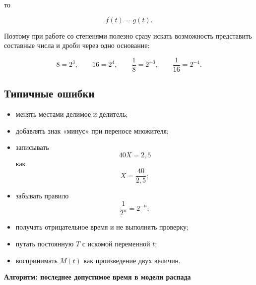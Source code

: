 \documentclass[a4paper,12pt]{article}
\newcommand{\subsect}[1]{%
  \subsection*{\color{accent}#1}%
}
\begin{document}
то

\[
f(t)=g(t).
\]

Поэтому при работе со степенями полезно сразу искать возможность
представить составные числа и дроби через одно основание:

\[
8=2^3,
\qquad
16=2^4,
\qquad
\frac18=2^{-3},
\qquad
\frac1{16}=2^{-4}.
\]


\subsect{Типичные ошибки}

\begin{itemize}

  \item менять местами делимое и делитель;

  \item добавлять знак «минус» при переносе множителя;

  \item записывать
  \[
  40X=2{,}5
  \]
  как
  \[
  X=\frac{40}{2{,}5};
  \]

  \item забывать правило
  \[
  \frac1{2^n}=2^{-n};
  \]

  \item получать отрицательное время и не выполнять проверку;

  \item путать постоянную $T$ с искомой переменной $t$;

  \item воспринимать $M(t)$ как произведение двух величин.

\end{itemize}


\clearpage
\thispagestyle{empty}

\begin{center}

{\Large
\color{darkaccent}
\textbf{
Алгоритм: последнее допустимое время в модели распада
}
}

\end{center}

\vspace{8mm}
\end{document}

